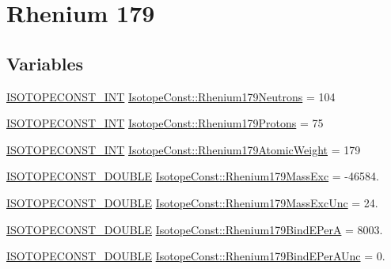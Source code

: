 \hypertarget{group___isotope_const-_rhenium-_re179}{}\section{Rhenium 179}
\label{group___isotope_const-_rhenium-_re179}
\subsection*{Variables}
\begin{DoxyCompactItemize}
\item 
\mbox{\hyperlink{group___isotope_const-_macros_ga5f18360b3e99483a35c32d789e62621c}{I\+S\+O\+T\+O\+P\+E\+C\+O\+N\+S\+T\+\_\+\+I\+NT}} \mbox{\hyperlink{group___isotope_const-_rhenium-_re179_gae0d06c2c188c6e7875120db19db86bb2}{Isotope\+Const\+::\+Rhenium179\+Neutrons}} = 104
\item 
\mbox{\hyperlink{group___isotope_const-_macros_ga5f18360b3e99483a35c32d789e62621c}{I\+S\+O\+T\+O\+P\+E\+C\+O\+N\+S\+T\+\_\+\+I\+NT}} \mbox{\hyperlink{group___isotope_const-_rhenium-_re179_gac6f4e41f4f919e32f729a0969de5e8c2}{Isotope\+Const\+::\+Rhenium179\+Protons}} = 75
\item 
\mbox{\hyperlink{group___isotope_const-_macros_ga5f18360b3e99483a35c32d789e62621c}{I\+S\+O\+T\+O\+P\+E\+C\+O\+N\+S\+T\+\_\+\+I\+NT}} \mbox{\hyperlink{group___isotope_const-_rhenium-_re179_gaf074360db5d9ef111429c99262894ef9}{Isotope\+Const\+::\+Rhenium179\+Atomic\+Weight}} = 179
\item 
\mbox{\hyperlink{group___isotope_const-_macros_ga8f45a7272ce02c0b4c65c44636ed719a}{I\+S\+O\+T\+O\+P\+E\+C\+O\+N\+S\+T\+\_\+\+D\+O\+U\+B\+LE}} \mbox{\hyperlink{group___isotope_const-_rhenium-_re179_gab4f14c8e6447aaa19950f7ad3a257d9d}{Isotope\+Const\+::\+Rhenium179\+Mass\+Exc}} = -\/46584.
\item 
\mbox{\hyperlink{group___isotope_const-_macros_ga8f45a7272ce02c0b4c65c44636ed719a}{I\+S\+O\+T\+O\+P\+E\+C\+O\+N\+S\+T\+\_\+\+D\+O\+U\+B\+LE}} \mbox{\hyperlink{group___isotope_const-_rhenium-_re179_ga424be4178a1efe570c4e8745e9e95d35}{Isotope\+Const\+::\+Rhenium179\+Mass\+Exc\+Unc}} = 24.
\item 
\mbox{\hyperlink{group___isotope_const-_macros_ga8f45a7272ce02c0b4c65c44636ed719a}{I\+S\+O\+T\+O\+P\+E\+C\+O\+N\+S\+T\+\_\+\+D\+O\+U\+B\+LE}} \mbox{\hyperlink{group___isotope_const-_rhenium-_re179_gafc673d79b1cf64cc8e2c7e5fa79c0ddc}{Isotope\+Const\+::\+Rhenium179\+Bind\+E\+PerA}} = 8003.
\item 
\mbox{\hyperlink{group___isotope_const-_macros_ga8f45a7272ce02c0b4c65c44636ed719a}{I\+S\+O\+T\+O\+P\+E\+C\+O\+N\+S\+T\+\_\+\+D\+O\+U\+B\+LE}} \mbox{\hyperlink{group___isotope_const-_rhenium-_re179_ga2e0e7446162d2dafea41c0e83d01f91f}{Isotope\+Const\+::\+Rhenium179\+Bind\+E\+Per\+A\+Unc}} = 0.

\end{DoxyCompactItemize}
